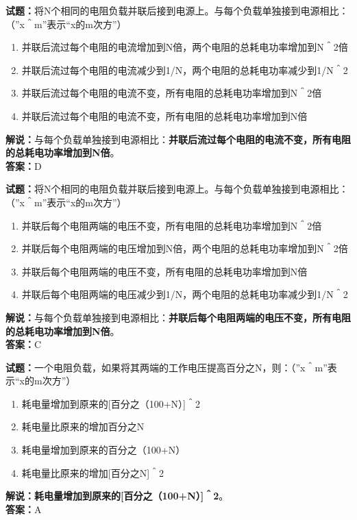 \documentclass{ctexbook}
\begin{document}
\bigskip


\noindent\textbf{试题：}将N个相同的电阻负载并联后接到电源上。与每个负载单独接到电源相比：（”x＾m”表示“x的m次方”）
\begin{enumerate}[leftmargin=3em]
\item 并联后流过每个电阻的电流增加到N倍，两个电阻的总耗电功率增加到N＾2倍
\item 并联后流过每个电阻的电流减少到1/N，两个电阻的总耗电功率减少到1/N＾2
\item 并联后流过每个电阻的电流不变，所有电阻的总耗电功率增加到N＾2倍
\item 并联后流过每个电阻的电流不变，所有电阻的总耗电功率增加到N倍
\end{enumerate}
\noindent\textbf{解说：}与每个负载单独接到电源相比：\textbf{并联后流过每个电阻的电流不变，所有电阻的总耗电功率增加到N倍}。\\\noindent\textbf{答案：}D



\bigskip


\noindent\textbf{试题：}将N个相同的电阻负载并联后接到电源上。与每个负载单独接到电源相比：（”x＾m”表示“x的m次方”）
\begin{enumerate}[leftmargin=3em]
\item 并联后每个电阻两端的电压不变，所有电阻的总耗电功率增加到N＾2倍
\item 并联后每个电阻两端的电压增加到N倍，两个电阻的总耗电功率增加到N＾2倍
\item 并联后每个电阻两端的电压不变，所有电阻的总耗电功率增加到N倍
\item 并联后每个电阻两端的电压减少到1/N，两个电阻的总耗电功率减少到1/N＾2
\end{enumerate}
\noindent\textbf{解说：}与每个负载单独接到电源相比：\textbf{并联后每个电阻两端的电压不变，所有电阻的总耗电功率增加到N倍}。\\\noindent\textbf{答案：}C



\bigskip


\noindent\textbf{试题：}一个电阻负载，如果将其两端的工作电压提高百分之N，则：（”x＾m”表示“x的m次方”）
\begin{enumerate}[leftmargin=3em]
\item 耗电量增加到原来的[百分之（100+N）]＾2
\item 耗电量比原来的增加百分之N
\item 耗电量增加到原来的百分之（100+N）
\item 耗电量比原来的增加[百分之N]＾2
\end{enumerate}
\noindent\textbf{解说：}\textbf{耗电量增加到原来的[百分之（100+N）]＾2}。\\\noindent\textbf{答案：}A
\end{document}
